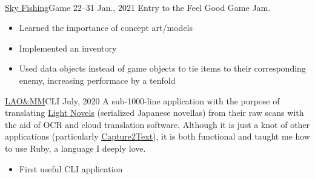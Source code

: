 \documentclass[10pt,a4paper,ragged2e,withhyper]{altacv}
\begin{document}
\begin{paracol}{2}
	
	\newpage
	
	\switchcolumn
	
	\cvtag{\LaTeX}
	
	 \\
	
	
	\cvevent
	{\href{https://jimmys-test-site.itch.io/skyfishing}{\uline{Sky Fishing}}{\hr}Game}
	{}
	{22--31 Jan., 2021}{}
	Entry to the Feel Good Game Jam.
	\smallskip
	\begin{itemize}
		\item Learned the importance of concept art/models
		\item Implemented an inventory
		\item Used data objects instead of game objects to tie items to their corresponding enemy, increasing performace by a tenfold
	\end{itemize}
	
	\divider
	
	\cvevent
	{\href{https://github.com/jaacko-torus/lao-mm/}{\uline{LAO\&MM}}{\hr}CLI}
	{}
	{July, 2020}{}
	A sub-1000-line application with the purpose of translating \href{https://en.wikipedia.org/wiki/Light_novel}{\uline{Light Novels}} (serialized Japanese novellas) from their raw scans with the aid of OCR and cloud translation software. Although it is just a knot of other applications (particularly \href{http://capture2text.sourceforge.net}{\uline{Capture2Text}}), it is both functional and taught me how to use Ruby, a language I deeply love.
	\smallskip
	\begin{itemize}
		\item First useful CLI application
	\end{itemize}
	

\end{paracol}
\end{document}

